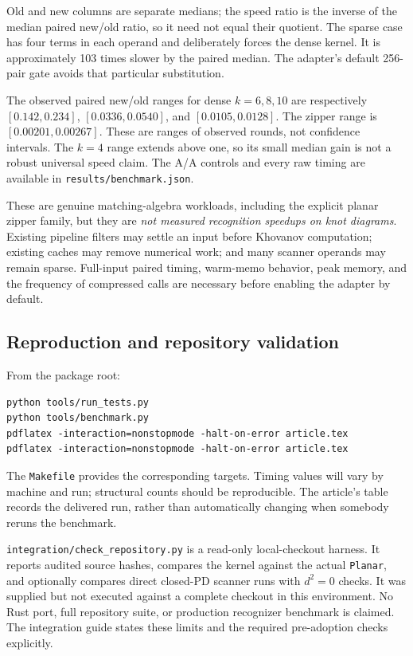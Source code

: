 \documentclass[11pt,letterpaper]{article}
\theoremstyle{definition}
\theoremstyle{remark}
\begin{document}
Old and new columns are separate medians; the speed ratio is the inverse
of the median paired new/old ratio, so it need not equal their quotient.
The sparse case has four terms in each operand and deliberately forces the
dense kernel. It is approximately 103 times slower by the paired median.
The adapter's default 256-pair gate avoids that particular substitution.

The observed paired new/old ranges for dense $k=6,8,10$ are respectively
$[0.142,0.234]$, $[0.0336,0.0540]$, and $[0.0105,0.0128]$.
The zipper range is $[0.00201,0.00267]$.
These are ranges of observed rounds, not confidence intervals.
The $k=4$ range extends above one, so its small median gain is not a
robust universal speed claim. The A/A controls and every raw timing are
available in \texttt{results/benchmark.json}.

These are genuine matching-algebra workloads, including the explicit
planar zipper family, but they are \emph{not measured recognition speedups
on knot diagrams}. Existing pipeline filters may settle an input before
Khovanov computation; existing caches may remove numerical work; and many
scanner operands may remain sparse. Full-input paired timing, warm-memo
behavior, peak memory, and the frequency of compressed calls are necessary
before enabling the adapter by default.

\subsection{Reproduction and repository validation}
From the package root:
\begin{lstlisting}
python tools/run_tests.py
python tools/benchmark.py
pdflatex -interaction=nonstopmode -halt-on-error article.tex
pdflatex -interaction=nonstopmode -halt-on-error article.tex
\end{lstlisting}
The \texttt{Makefile} provides the corresponding targets. Timing values
will vary by machine and run; structural counts should be reproducible.
The article's table records the delivered run, rather than automatically
changing when somebody reruns the benchmark.

\texttt{integration/check\_repository.py} is a read-only local-checkout
harness. It reports audited source hashes, compares the kernel against the
actual \texttt{Planar}, and optionally compares direct closed-PD scanner
runs with $d^2=0$ checks. It was supplied but not executed against a complete
checkout in this environment. No Rust port, full repository suite, or
production recognizer benchmark is claimed. The integration guide states
these limits and the required pre-adoption checks explicitly.
\end{document}

